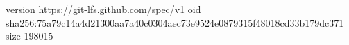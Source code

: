 version https://git-lfs.github.com/spec/v1
oid sha256:75a79c14a4d21300aa7a40c0304aec73e9524e0879315f48018cd33b179dc371
size 198015
